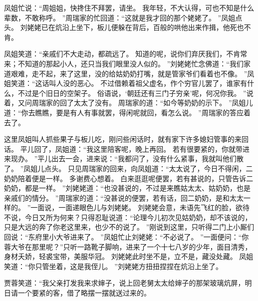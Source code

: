 凤姐忙说：“周姐姐，快搀住不拜罢，请坐。
我年轻，不大认得，可也不知是什么辈数，不敢称呼。
”周瑞家的忙回道：“这就是我才回的那个姥姥了。
”凤姐点头。
刘姥姥已在炕沿上坐下，板儿便躲在背后，百般的哄他出来作揖，他死也不肯。
\par
凤姐笑道：“亲戚们不大走动，都疏远了。
知道的呢，说你们弃厌我们，不肯常来；不知道的那起小人，还只当我们眼里没人似的。
”刘姥姥忙念佛道：“我们家道艰难，走不起，来了这里，没的给姑奶奶打嘴，就是管家爷们看着也不像。
”凤姐笑道：“这话叫人没的恶心。
不过借赖着祖父虚名，作个穷官儿罢了，谁家有什么，不过是个旧日的空架子。
俗语说，‘朝廷还有三门子穷亲’呢，何况你我。
”说着，又问周瑞家的回了太太了没有。
周瑞家的道：“如今等奶奶的示下。
”凤姐儿道：“你去瞧瞧，要是有人有事就罢，得闲呢就回，看怎么说。
”周瑞家的答应着去了。
\par
这里凤姐叫人抓些果子与板儿吃，刚问些闲话时，就有家下许多媳妇管事的来回话。
平儿回了，凤姐道：“我这里陪客呢，晚上再回。
若有很要紧的，你就带进来现办。
”平儿出去一会，进来说：“我都问了，没有什么紧事，我就叫他们散了。
”凤姐儿点头。
只见周瑞家的回来，向凤姐道：“太太说了，今日不得闲，二奶奶陪着便是一样。
多谢费心想着。
白来逛逛呢便罢，若有甚说的，只管告诉二奶奶，都是一样。
”刘姥姥道：“也没甚说的，不过是来瞧姑太太、姑奶奶，也是亲戚们的情分。
”周瑞家的道：“没甚说的便罢，若有话，回二奶奶，是和太太一样的。
”一面说，一面递眼色儿与刘姥姥。
刘姥姥会意，未语先飞红的脸，欲待不说，今日又所为何来？只得忍耻说道：“论理今儿初次见姑奶奶，却不该说的，只是大远的奔了你老这里来，也少不的说了。
”刚说到这里，只听得二门上小厮们回说：“东府里小大爷进来了。
”凤姐忙止刘姥姥：“不必说了。
”一面便问：“你蓉大爷在那里呢？”只听一路靴子脚响，进来了一个十七八岁的少年，面目清秀，身材夭娇，轻裘宝带，美服华冠。
刘姥姥此时坐不是，立不是，藏没处藏。
凤姐笑道：“你只管坐着，这是我侄儿。
”刘姥姥方扭扭捏捏在炕沿上坐了。
\par
贾蓉笑道：“我父亲打发我来求婶子，说上回老舅太太给婶子的那架玻璃炕屏，明日请一个要紧的客，借了略摆一摆就送过来的。
